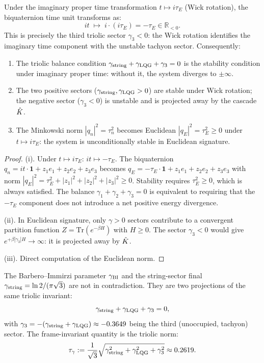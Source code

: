 \begin{theorem}\label{thm:wick}
Under the imaginary proper time transformation $t\mapsto i\tau_E$
(Wick rotation), the biquaternion time unit transforms as:
\[
 it \;\mapsto\; i\cdot(i\tau_E) = -\tau_E \in\mathbb{R}_{<0}.
\]
This is precisely the third triolic sector $\gamma_3<0$: the Wick
rotation identifies the imaginary time component with the unstable
tachyon sector.
Consequently:
\begin{enumerate}[label=(\roman*)]
 \item The triolic balance condition
 $\gamma_{\mathrm{string}}+\gamma_{\mathrm{LQG}}+\gamma_3=0$ is the stability
 condition under imaginary proper time: without it, the system
 diverges to $\pm\infty$.
 \item The two positive sectors ($\gamma_{\mathrm{string}},\gamma_{\mathrm{LQG}}>0$)
 are stable under Wick rotation; the negative sector
 ($\gamma_3<0$) is unstable and is projected away by the
 cascade $\hat{K}$.
 \item The Minkowski norm $|q_n|^2=\tau_n^2$ becomes Euclidean
 $|q_E|^2=\tau_E^2\geq 0$ under $t\mapsto i\tau_E$: the system
 is unconditionally stable in Euclidean signature.
\end{enumerate}
\begin{proof}
(i). Under $t\mapsto i\tau_E$: $it\mapsto -\tau_E$.
The biquaternion $q_n=it\cdot\mathbf{1}+z_1 e_1+z_2 e_2+z_3 e_3$ becomes
$q_E=-\tau_E\cdot\mathbf{1}+z_1 e_1+z_2 e_2+z_3 e_3$
with norm $|q_E|^2=\tau_E^2+|z_1|^2+|z_2|^2+|z_3|^2\geq 0$.
Stability requires $\tau_E^2\geq 0$, which is always satisfied.
The balance $\gamma_1+\gamma_2+\gamma_3=0$ is equivalent to requiring
that the $-\tau_E$ component does not introduce a net positive energy
divergence.

(ii). In Euclidean signature, only $\gamma>0$ sectors contribute to a
convergent partition function $Z=\mathrm{Tr}(e^{-\beta H})$ with $H\geq 0$.
The sector $\gamma_3<0$ would give $e^{+\beta|\gamma_3|H}\to\infty$:
it is projected away by $\hat{K}$.

(iii). Direct computation of the Euclidean norm.
\end{proof}
\end{theorem}

\begin{theorem}
\label{thm:triolic-gBI}
The Barbero--Immirzi parameter $\gamma_{\mathrm{BI}}$ and the string-sector final
$\gamma_{\mathrm{string}} = \ln 2/(\pi\sqrt{3})$ are not in contradiction.
They are two projections of the same triolic invariant:
\[
 \gamma_{\mathrm{string}} + \gamma_{\mathrm{LQG}} + \gamma_3 = 0,
\]
with $\gamma_3 = -(\gamma_{\mathrm{string}}+\gamma_{\mathrm{LQG}})\approx -0.3649$ being
the third (unoccupied, tachyon) sector.
The frame-invariant quantity is the triolic norm:
\[
 \tau_\gamma := \frac{1}{\sqrt{3}}
 \sqrt{\gamma_{\mathrm{string}}^2+\gamma_{\mathrm{LQG}}^2+\gamma_3^2}\approx 0.2619.
\]
\end{theorem}

